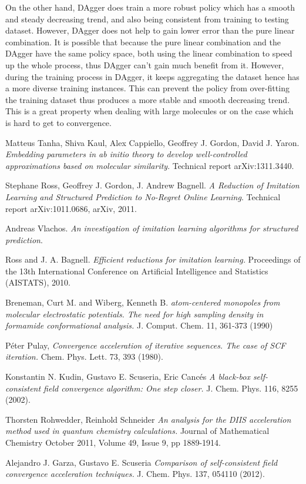\documentclass[twoside]{article}
\begin{document}
On the other hand, DAgger does train a more robust policy which has a smooth and steady decreasing trend, and also being consistent from training to testing dataset. However, DAgger does not help to gain lower error than the pure linear combination. It is possible that because the pure linear combination and the DAgger have the same policy space, both using the linear combination to speed up the whole process, thus DAgger can't gain much benefit from it. However, during the training process in DAgger, it keeps aggregating the dataset hence has a more diverse training instances. This can prevent the policy from over-fitting the training dataset thus produces a more stable and smooth decreasing trend. This is a great property when dealing with large molecules or on the case which is hard to get to convergence.


\begin{thebibliography}{9}
  Matteus Tanha, Shiva Kaul, Alex Cappiello, Geoffrey J. Gordon, David J. Yaron.
  \emph{Embedding parameters in ab initio theory to develop well-controlled approximations based on molecular similarity}.
  Technical report arXiv:1311.3440.
  
  Stephane Ross, Geoffrey J. Gordon, J. Andrew Bagnell.
  \emph{A Reduction of Imitation Learning and Structured Prediction to No-Regret Online Learning}.
  Technical report arXiv:1011.0686, arXiv, 2011.
  
  Andreas Vlachos.
  \emph{An investigation of imitation learning algorithms for structured prediction}.
  
    Ross and J. A. Bagnell.
  \emph{Efficient reductions for imitation
learning.} Proceedings of the 13th International
Conference on Artificial Intelligence and Statistics (AISTATS),
2010.

	Breneman, Curt M. and Wiberg, Kenneth B.
  \emph{ atom-centered monopoles from molecular electrostatic potentials. The need for high sampling density in formamide conformational analysis.} J. Comput. Chem. 11, 361-373 (1990)

   P\'{e}ter Pulay,
  \emph{Convergence acceleration of iterative sequences. The case of SCF iteration.} Chem. Phys. Lett. 73, 393 (1980).

   Konstantin N. Kudin, Gustavo E. Scuseria, Eric Canc\'{e}s
  \emph{A black-box self-consistent field convergence algorithm: One step closer.} J. Chem. Phys. 116, 8255 (2002).

  Thorsten Rohwedder, Reinhold Schneider
  \emph{An analysis for the DIIS acceleration method used in quantum chemistry calculations.} Journal of Mathematical Chemistry
October 2011, Volume 49, Issue 9, pp 1889-1914.
  
  Alejandro J. Garza, Gustavo E. Scuseria
  \emph{Comparison of self-consistent field convergence acceleration techniques.} J. Chem. Phys. 137, 054110 (2012).
\end{thebibliography}
\end{document}
